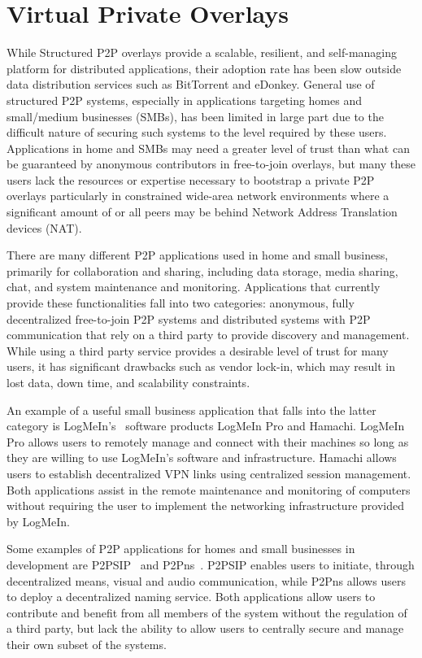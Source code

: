 \chapter{Virtual Private Overlays}
\label{vpo}
While Structured P2P overlays provide a scalable, resilient, and self-managing
platform for distributed applications, their adoption rate has been slow
outside data distribution services such as BitTorrent and eDonkey.  General use
of structured P2P systems, especially in applications targeting homes and
small/medium businesses (SMBs), has been limited in large part due to the
difficult nature of securing such systems to the level required by these users.
Applications in home and SMBs may need a greater level of trust than what can
be guaranteed by anonymous contributors in free-to-join overlays, but many these
users lack the resources or expertise necessary to bootstrap a private P2P
overlays particularly in constrained wide-area network environments where a
significant amount of or all peers may be behind Network Address Translation
devices (NAT).

There are many different P2P applications used in home and small business,
primarily for collaboration and sharing, including data storage, media sharing,
chat, and system maintenance and monitoring.  Applications that currently
provide these functionalities fall into two categories:  anonymous, fully
decentralized free-to-join P2P systems and distributed systems with P2P
communication that rely on a third party to provide discovery and management.
While using a third party service provides a desirable level of trust for many
users, it has significant drawbacks such as vendor lock-in, which may result in
lost data, down time, and scalability constraints.

An example of a useful small business application that falls into the latter
category is LogMeIn's~\cite{logmein} software products LogMeIn Pro and Hamachi.
LogMeIn Pro allows users to remotely manage and connect with their machines so
long as they are willing to use LogMeIn's software and infrastructure.  Hamachi
allows users to establish decentralized VPN links using centralized session
management.  Both applications assist in the remote maintenance and monitoring
of computers without requiring the user to implement the networking
infrastructure provided by LogMeIn.

Some examples of P2P applications for homes and small businesses in development
are P2PSIP~\cite{p2psip} and P2Pns~\cite{p2pns}.  P2PSIP enables users to
initiate, through decentralized means, visual and audio communication, while
P2Pns allows users to deploy a decentralized naming service.  Both applications
allow users to contribute and benefit from all members of the system without
the regulation of a third party, but lack the ability to allow users to
centrally secure and manage their own subset of the systems.

